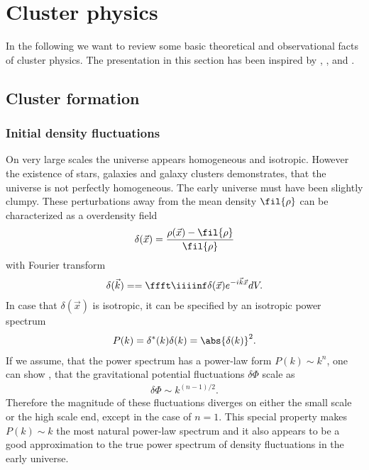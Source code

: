 \chapter{Cluster physics}\label{clustertheo}
In the following we want to review some basic theoretical and observational
facts of cluster physics. The presentation in this section has been inspired by
\citet{Pfrommer2005}, \citet{Sarazin1988}, \citet{Voit2005} and
\citet{Plionis2008}.

\section{Cluster formation}
\subsection{Initial density fluctuations}
On very large scales the universe appears homogeneous and isotropic. However
the existence of stars, galaxies and galaxy clusters demonstrates, that the
universe is not perfectly homogeneous. The early universe must have been
slightly clumpy. These perturbations away from the mean density $\fil{\rho}$ can
be characterized as a overdensity field 
\begin{align}
\delta(\vec{x}) = \frac{\rho(\vec{x})-\fil{\rho}}{\fil{\rho}}
\end{align}
with Fourier transform
\begin{align}
\delta(\vec{k}) = =\ffft\iiiinf \delta(\vec{x}) e^{-i\vec{k}\vec{x}} dV.
\end{align}
In case that $\delta(\vec{x})$ is isotropic, it can be specified by an
isotropic power spectrum
\begin{align}
P(k) = \delta^*(k)\delta(k)= \abs{\delta(k)}^2.
\end{align}
If we assume, that the power spectrum has a power-law form $P(k) \sim k^n$, one
can show \citep{Peebles1970}, that the gravitational potential fluctuations 
$\delta\Phi$ scale as
\begin{align}
\delta\Phi \sim k^{(n-1)/2}.
\end{align}
Therefore the magnitude of these fluctuations diverges on either the
small scale or the high scale end, except in the case of $n=1$. This special
property makes $P(k) \sim k$ the most natural power-law spectrum and it also
appears to be a good approximation to the true power spectrum of density
fluctuations in the early universe. 

